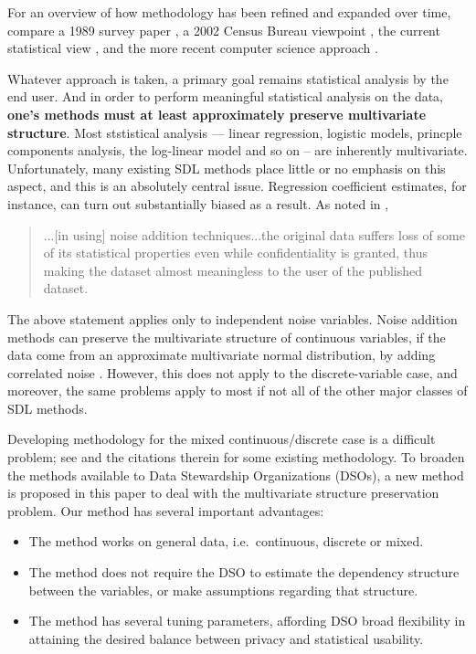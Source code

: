 \documentclass[11pt]{article}
\begin{document}
For an overview of how methodology has been refined and expanded over
time, compare a 1989 survey paper \cite{adam}, a 2002 Census Bureau
viewpoint \cite{census2002}, the current statistical view \cite{duncan},
and the more recent computer science approach \cite{dwork}.

Whatever approach is taken, a primary goal remains statistical analysis
by the end user.  And in order to perform meaningful statistical
analysis on the data, {\bf one's methods must at least approximately
preserve multivariate structure}.  Most ststistical analysis --- linear
regression, logistic models, princple components analysis, the
log-linear model and so on -- are inherently multivariate.
Unfortunately, many existing SDL methods place little or no emphasis on
this aspect, and this is an absolutely central issue.  Regression
coefficient estimates, for instance, can turn out substantially biased
as a result.  As noted in \cite{nivule},

\begin{quote}
...[in using] noise addition techniques...the original data
suffers loss of some of its statistical properties even while
confidentiality is granted, thus making the dataset almost meaningless
to the user of the published dataset. 
\end{quote}

The above statement applies only to independent noise variables. Noise
addition methods can preserve the multivariate structure of continuous
variables, if the data come from an approximate multivariate normal
distribution, by adding correlated noise \cite{matloff1986}
\cite{kim} \cite{tendick}.  However, this does not apply to the
discrete-variable case, and moreover, the same problems apply to most if
not all of the other major classes of SDL methods.

Developing methodology for the mixed continuous/discrete case is a
difficult problem; see \cite{manrique} and the citations therein for
some existing methodology.  To broaden the methods available to Data
Stewardship Organizations (DSOs), a new method is proposed in this paper
to deal with the multivariate structure preservation problem. Our method
has several important advantages:

\begin{itemize}

\item The method works on general data, i.e.\ continuous, discrete or
mixed. 

\item The method does not require the DSO to estimate the dependency
structure between the variables, or make assumptions regarding that
structure.

\item The method has several tuning parameters, affording DSO
broad flexibility in attaining the desired balance between
privacy and statistical usability.

\end{itemize}
\end{document}
